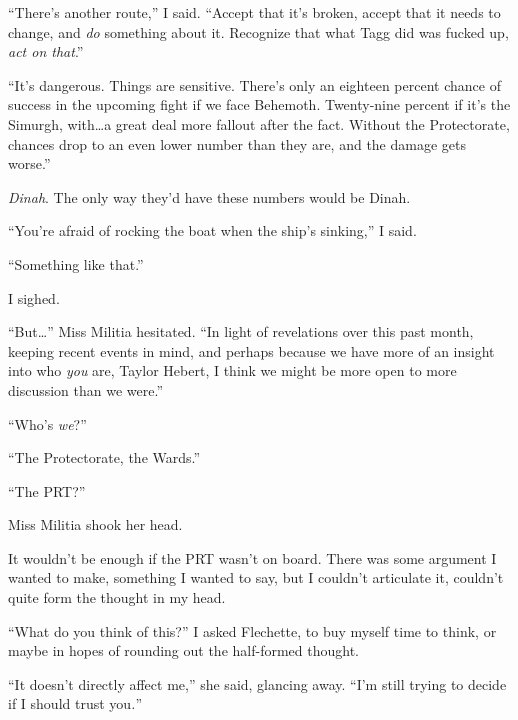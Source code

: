 ``There's another route,'' I said.  ``Accept that it's broken, accept that it needs to change, and \emph{do} something about it.  Recognize that what Tagg did was fucked up, \emph{act on that}.''



``It's dangerous.  Things are sensitive.  There's only an eighteen percent chance of success in the upcoming fight if we face Behemoth.  Twenty-nine percent if it's the Simurgh, with\ldots a great deal more fallout after the fact.   Without the Protectorate, chances drop to an even lower number than they are, and the damage gets worse.''



\emph{Dinah}.  The only way they'd have these numbers would be Dinah.



``You're afraid of rocking the boat when the ship's sinking,'' I said.



``Something like that.''



I sighed.



``But\ldots'' Miss Militia hesitated.  ``In light of revelations over this past month, keeping recent events in mind, and perhaps because we have more of an insight into who \emph{you} are, Taylor Hebert, I think we might be more open to more discussion than we were.''



``Who's \emph{we}?''



``The Protectorate, the Wards.''



``The PRT?''



Miss Militia shook her head.



It wouldn't be enough if the PRT wasn't on board.  There was some argument I wanted to make, something I wanted to say, but I couldn't articulate it, couldn't quite form the thought in my head.



``What do you think of this?'' I asked Flechette, to buy myself time to think, or maybe in hopes of rounding out the half-formed thought.



``It doesn't directly affect me,'' she said, glancing away.  ``I'm still trying to decide if I should trust you\emph{.}''



